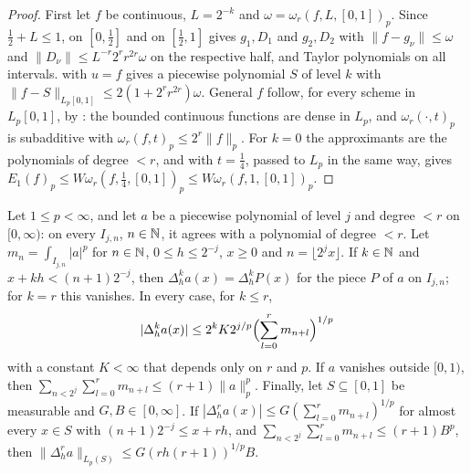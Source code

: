 \begin{proof}
\leanok
First let $f$ be continuous, $L = 2^{-k}$ and $\omega = \omega_r(f, L, [0,1])_p$. Since
$\tfrac12 + L \leq 1$,  on $[0, \tfrac12]$ and on $[\tfrac12, 1]$
gives $g_1, D_1$ and $g_2, D_2$ with $\|f - g_\nu\| \leq \omega$ and
$\|D_\nu\| \leq L^{-r} 2^r r^{2r} \omega$ on the respective half, and Taylor polynomials on all
intervals.  with $u = f$ gives a piecewise polynomial $S$ of level $k$ with
$\|f - S\|_{L_p[0,1]} \leq 2 (1 + 2^r r^{2r}) \omega$. General $f$ follow, for every scheme in
$L_p[0,1]$, by
: the bounded continuous functions are dense in $L_p$, and
$\omega_r(\cdot, t)_p$ is subadditive with $\omega_r(f, t)_p \leq 2^r \|f\|_p$. For $k = 0$ the approximants are the
polynomials of degree $< r$, and  with $t = \tfrac14$, passed to $L_p$ in the
same way, gives $E_1(f)_p \leq W \omega_r(f, \tfrac14, [0,1])_p \leq W \omega_r(f, 1, [0,1])_p$.
\end{proof}

\begin{lemma}
\label{lem:pp-local}
\leanok
{}
Let $1 \leq p < \infty$, and let $a$ be a piecewise polynomial of level $j$ and degree $< r$
on $[0, \infty)$: on every $I_{j,n}$, $n \in \mathbb{N}$, it agrees with a polynomial of degree $< r$.
Let $m_n = \int_{I_{j,n}} |a|^p$ for $n \in \mathbb{N}$, $0 \leq h \leq 2^{-j}$, $x \geq 0$ and
$n = \lfloor 2^j x \rfloor$. If $k \in \mathbb{N}$ and $x + kh < (n+1) 2^{-j}$, then
$\Delta_h^k a(x) = \Delta_h^k P(x)$ for the piece $P$ of $a$ on $I_{j,n}$; for $k = r$ this
vanishes. In every case, for $k \leq r$,
\[
  |\Delta_h^k a(x)| \leq 2^k K 2^{j/p} \Bigl( \sum_{l=0}^r m_{n+l} \Bigr)^{1/p}
\]
with a constant $K < \infty$ that depends only on $r$ and $p$. If $a$ vanishes outside $[0, 1)$,
then $\sum_{n < 2^j} \sum_{l = 0}^r m_{n+l} \leq (r+1) \|a\|_p^p$. Finally, let $S \subseteq [0, 1]$
be measurable and $G, B \in [0, \infty]$. If $|\Delta_h^r a(x)| \leq G (\sum_{l=0}^r m_{n+l})^{1/p}$
for almost every $x \in S$ with $(n+1) 2^{-j} \leq x + rh$, and
$\sum_{n < 2^j} \sum_{l = 0}^r m_{n+l} \leq (r+1) B^p$, then
$\|\Delta_h^r a\|_{L_p(S)} \leq G (rh (r + 1))^{1/p} B$.
\end{lemma}

